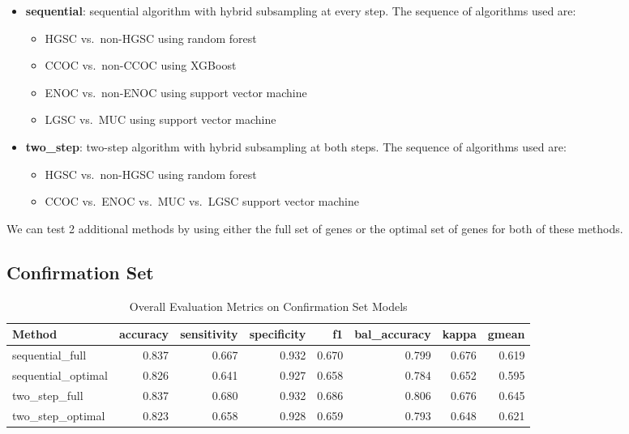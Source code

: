 \documentclass[
]{report}
\providecommand{\tightlist}{%
  \setlength{\itemsep}{0pt}\setlength{\parskip}{0pt}}
\begin{document}
\begin{itemize}
\tightlist
\item
  \textbf{sequential}: sequential algorithm with hybrid subsampling at every step. The sequence of algorithms used are:

  \begin{itemize}
  \tightlist
  \item
    HGSC vs.~non-HGSC using random forest
  \item
    CCOC vs.~non-CCOC using XGBoost
  \item
    ENOC vs.~non-ENOC using support vector machine
  \item
    LGSC vs.~MUC using support vector machine
  \end{itemize}
\item
  \textbf{two\_step}: two-step algorithm with hybrid subsampling at both steps. The sequence of algorithms used are:

  \begin{itemize}
  \tightlist
  \item
    HGSC vs.~non-HGSC using random forest
  \item
    CCOC vs.~ENOC vs.~MUC vs.~LGSC support vector machine
  \end{itemize}
\end{itemize}

We can test 2 additional methods by using either the full set of genes or the optimal set of genes for both of these methods.

\subsection{Confirmation Set}\label{confirmation-set}

\begin{table}

\caption{\label{tab:conf-eval-overall}Overall Evaluation Metrics on Confirmation Set Models}
\centering
\begin{tabular}[t]{l|r|r|r|r|r|r|r}
\hline
Method & accuracy & sensitivity & specificity & f1 & bal\_accuracy & kappa & gmean\\
\hline
sequential\_full & 0.837 & 0.667 & 0.932 & 0.670 & 0.799 & 0.676 & 0.619\\
\hline
sequential\_optimal & 0.826 & 0.641 & 0.927 & 0.658 & 0.784 & 0.652 & 0.595\\
\hline
two\_step\_full & 0.837 & 0.680 & 0.932 & 0.686 & 0.806 & 0.676 & 0.645\\
\hline
two\_step\_optimal & 0.823 & 0.658 & 0.928 & 0.659 & 0.793 & 0.648 & 0.621\\
\hline
\end{tabular}
\end{table}
\end{document}
